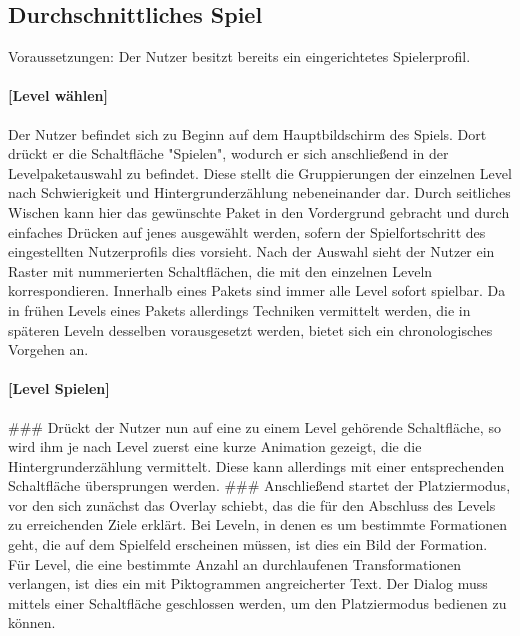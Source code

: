 \subsection{Durchschnittliches Spiel}
Voraussetzungen: Der Nutzer besitzt bereits ein eingerichtetes Spielerprofil.
\newline
\newline
\paragraph{{[}Level wählen{]}}
Der Nutzer befindet sich zu Beginn auf dem Hauptbildschirm des Spiels.
Dort drückt er die Schaltfläche "Spielen", wodurch er sich anschließend 
in der Levelpaketauswahl zu befindet. Diese stellt
die Gruppierungen der einzelnen Level nach Schwierigkeit und 
Hintergrunderzählung nebeneinander dar. Durch seitliches Wischen kann hier
das gewünschte Paket in den Vordergrund gebracht und durch einfaches
Drücken auf jenes ausgewählt werden, sofern der Spielfortschritt des 
eingestellten Nutzerprofils dies vorsieht. Nach der Auswahl sieht der Nutzer
ein Raster mit nummerierten Schaltflächen, die mit den einzelnen Leveln
korrespondieren. Innerhalb eines Pakets sind immer alle Level sofort 
spielbar. Da in frühen Levels eines Pakets allerdings Techniken vermittelt
werden, die in späteren Leveln desselben vorausgesetzt werden, bietet sich 
ein chronologisches Vorgehen an. 
\newline
\newline
\paragraph{{[}Level Spielen{]}}
\#\#\# Drückt der Nutzer nun auf eine zu einem
Level gehörende Schaltfläche, so wird ihm je nach Level zuerst eine kurze
Animation gezeigt, die die Hintergrunderzählung vermittelt. Diese kann 
allerdings mit einer entsprechenden Schaltfläche übersprungen werden. \#\#\#
\newline
\newline
Anschließend startet der Platziermodus, vor den sich zunächst das Overlay
schiebt, das die für den Abschluss des Levels zu erreichenden Ziele
erklärt. Bei Leveln, in denen es um bestimmte Formationen geht, die auf
dem Spielfeld erscheinen müssen, ist dies ein Bild der Formation. Für
Level, die eine bestimmte Anzahl an durchlaufenen Transformationen
verlangen, ist dies ein mit Piktogrammen angreicherter Text.
\newline
\newline
Der Dialog muss mittels einer Schaltfläche geschlossen werden, um den
Platziermodus bedienen zu können. 
\newline
\newline

